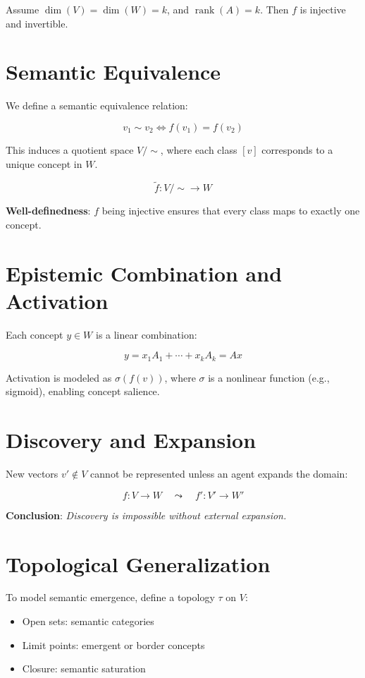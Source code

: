\documentclass[11pt]{article}
\begin{document}
    Assume $\dim(V) = \dim(W) = k$, and $\operatorname{rank}(A) = k$. Then $f$ is injective and invertible.

    \section{Semantic Equivalence}

    We define a semantic equivalence relation:

    \[
        v_1 \sim v_2 \iff f(v_1) = f(v_2)
    \]

    This induces a quotient space $V/\!\sim$, where each class $[v]$ corresponds to a unique concept in $W$.

    \[
        \tilde{f}: V/\!\sim \to W
    \]

    \textbf{Well-definedness}: $f$ being injective ensures that every class maps to exactly one concept.

    \section{Epistemic Combination and Activation}

    Each concept $y \in W$ is a linear combination:

    \[
        y = x_1 A_1 + \cdots + x_k A_k = A x
    \]

    Activation is modeled as $\sigma(f(v))$, where $\sigma$ is a nonlinear function (e.g., sigmoid), enabling concept salience.

    \section{Discovery and Expansion}

    New vectors $v' \notin V$ cannot be represented unless an agent expands the domain:

    \[
        f : V \to W \quad \leadsto \quad f' : V' \to W'
    \]

    \textbf{Conclusion}: \emph{Discovery is impossible without external expansion.}

    \section{Topological Generalization}

    To model semantic emergence, define a topology $\tau$ on $V$:

    \begin{itemize}[noitemsep]
        \item Open sets: semantic categories
        \item Limit points: emergent or border concepts
        \item Closure: semantic saturation
    \end{itemize}
\end{document}
